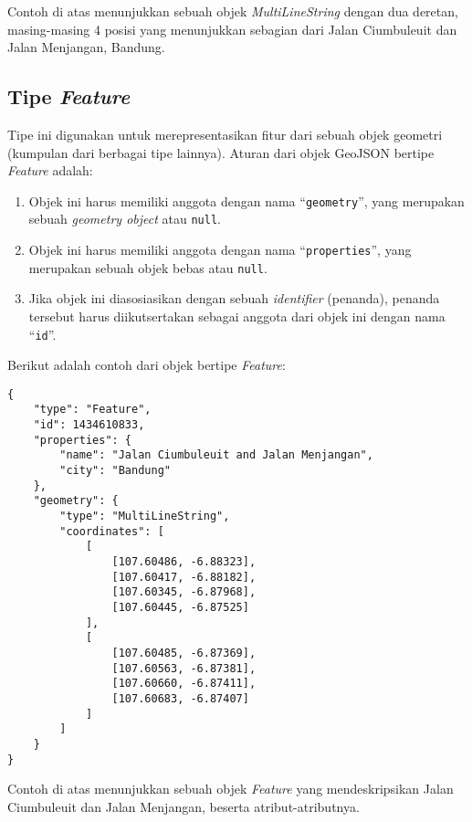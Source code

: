 Contoh di atas menunjukkan sebuah objek \textit{MultiLineString} dengan dua deretan, masing-masing 4 posisi yang menunjukkan sebagian dari Jalan Ciumbuleuit dan Jalan Menjangan, Bandung.

\subsection{Tipe \textit{Feature}}

Tipe ini digunakan untuk merepresentasikan fitur dari sebuah objek geometri (kumpulan dari berbagai tipe lainnya). Aturan dari objek GeoJSON bertipe \textit{Feature} adalah:

\begin{enumerate}
	\item Objek ini harus memiliki anggota dengan nama ``\texttt{geometry}'', yang merupakan sebuah \textit{geometry object} atau \texttt{null}.
	\item Objek ini harus memiliki anggota dengan nama ``\texttt{properties}'', yang merupakan sebuah objek bebas atau \texttt{null}.
	\item Jika objek ini diasosiasikan dengan sebuah \textit{identifier} (penanda), penanda tersebut harus diikutsertakan sebagai anggota dari objek ini dengan nama ``\texttt{id}''.
\end{enumerate}

Berikut adalah contoh dari objek bertipe \textit{Feature}:

\begin{lstlisting}
{
	"type": "Feature",
	"id": 1434610833,
	"properties": {
		"name": "Jalan Ciumbuleuit and Jalan Menjangan",
		"city": "Bandung"
	},
	"geometry": {
		"type": "MultiLineString",
		"coordinates": [
			[
				[107.60486, -6.88323],
				[107.60417, -6.88182],
				[107.60345, -6.87968],
				[107.60445, -6.87525]
			],
			[
				[107.60485, -6.87369],
				[107.60563, -6.87381],
				[107.60660, -6.87411],
				[107.60683, -6.87407]
			]
		]
	}
}
\end{lstlisting}

Contoh di atas menunjukkan sebuah objek \textit{Feature} yang mendeskripsikan Jalan Ciumbuleuit dan Jalan Menjangan, beserta atribut-atributnya.
